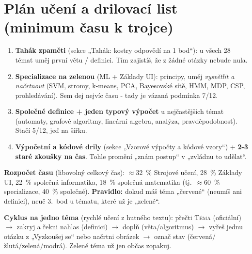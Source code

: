 \section{Plán učení a drilovací list (minimum času k trojce)}

\begin{infobox}[title={Pořadí učení (od nejvyššího výnosu)}]
\begin{enumerate}[leftmargin=1.4em]
  \item \textbf{Tahák zpaměti} (sekce „Tahák: kostry odpovědí na 1 bod“): u všech 28 témat
  uměj první větu / definici. Tím zajistíš, že z žádné otázky nebude nula.
  \item \textbf{Specializace na zelenou} (ML + Základy UI): principy, uměj \emph{vysvětlit a
  načrtnout} (SVM, stromy, k-means, PCA, Bayesovské sítě, HMM, MDP, CSP, prohledávání).
  Sem dej nejvíc času - tady je vázaná podmínka 7/12.
  \item \textbf{Společné definice + jeden typový výpočet} u nejčastějších témat (automaty,
  grafové algoritmy, lineární algebra, analýza, pravděpodobnost). Stačí 5/12, jeď na šířku.
  \item \textbf{Výpočetní a kódové drily} (sekce „Vzorové výpočty a kódové vzory“) + \textbf{2-3
  staré zkoušky na čas}. Tohle promění „znám postup“ v „zvládnu to udělat“.
\end{enumerate}
\end{infobox}

\noindent\textbf{Rozpočet času} (libovolný celkový čas): $\approx$32~\% Strojové učení,
28~\% Základy UI, 22~\% společná informatika, 18~\% společná matematika (tj.\ $\approx$60~\%
specializace, 40~\% společné). \textbf{Pravidlo:} dokud máš téma „červené“ (neumíš ani
definici), neuč 3.\ bod u tématu, které už je „zelené“.

\smallskip
\noindent\textbf{Cyklus na jedno téma} (rychlé učení z hutného textu): přečti \textsc{Téma}
(oficiální) $\to$ zakryj a řekni nahlas  (definici) $\to$ doplň 
(věta/algoritmus) $\to$ vyřeš jednu otázku z „Vyzkoušej se“ nebo načrtni obrázek $\to$ označ
stav (červená/žlutá/zelená/modrá). Zelené téma už jen občas zopakuj.

